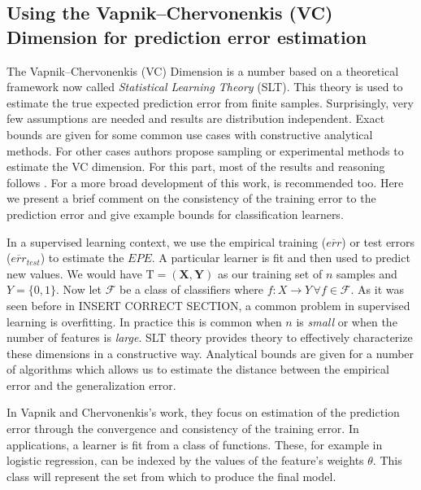 

\subsection{ Using the Vapnik–Chervonenkis (VC) Dimension for prediction error estimation} \label{section-VcDimension}

\cite{vapnik-nature2013}
\cite{cherkassky-learning2007}

The Vapnik–Chervonenkis (VC) Dimension is a number based on a theoretical framework now called \textit{Statistical Learning Theory} (SLT). This theory is used to estimate the true expected prediction error from finite samples. Surprisingly, very few assumptions are needed and results are distribution independent. Exact bounds are given for some common use cases with constructive analytical methods. For other cases authors propose sampling or experimental methods to estimate the VC dimension. For this part, most of the results and reasoning follows \cite{cherkassky-learning2007}. For a more broad development of this work, \cite{vapnik-nature2013} is recommended too. Here we present a brief comment on the consistency of the training error to the prediction error and give example bounds for classification learners.

In a supervised learning context, we use the empirical training ($\overline{err}$) or test errors ($\overline{err}_{test}$) to estimate the $EPE$. A particular learner is fit and then used to predict new values. We would have $\mathrm{T} = (\textbf{X},\textbf{Y})$ as our training set of $n$ samples   and $Y = \{0,1 \}$. Now let $\mathcal {F}$ be a class of classifiers where $f: X \rightarrow Y \, \forall f \in \mathcal {F}$. As it was seen before in INSERT CORRECT SECTION, a common problem in supervised learning is overfitting. In practice this is common when $n$ is \textit{small} or when the number of features is \textit{large}. SLT theory provides theory to effectively characterize these dimensions in a constructive way. Analytical bounds are given for a number of algorithms which allows us to estimate the distance between the empirical error and the generalization error.

In Vapnik and Chervonenkis's work, they focus on estimation of the prediction error through the convergence and consistency of the training error. In applications, a learner is fit from a class of functions. These, for example in logistic regression, can be indexed by the values of the feature's weights $\theta$. This class will represent the set from which to produce the final model.

